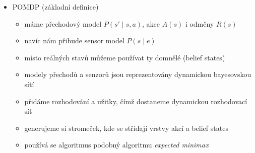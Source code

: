 \begin{itemize}
\begin{itemize}
\begin{itemize}
\begin{itemize}
\item policy evaluation = nalezení řešení těchto rovnic (tak najdeme utilities stavů)
\item gaussovka je $O(n^3)$
\item u velkých stavových prostorů dává smysl k policy evaluation použít value iteration
\end{itemize}
\item algoritmus doběhne, protože policies je jenom konečně mnoho a vždycky hledáme tu lepší
\end{itemize}
\end{itemize}
\item POMDP (základní definice)
\begin{itemize}
\item máme přechodový model $P(s'\mid s,a)$, akce $A(s)$ i odměny $R(s)$
\item navíc nám přibude sensor model $P(s\mid e)$
\item místo reálných stavů můžeme používat ty domnělé (belief states)
\item modely přechodů a senzorů jsou reprezentovány dynamickou bayesovskou sítí
\item přidáme rozhodování a užitky, čímž dostaneme dynamickou rozhodovací síť
\item generujeme si stromeček, kde se střídají vrstvy akcí a belief states
\item používá se algoritmus podobný algoritmu \textit{expected minimax}
\end{itemize}
\end{itemize}

